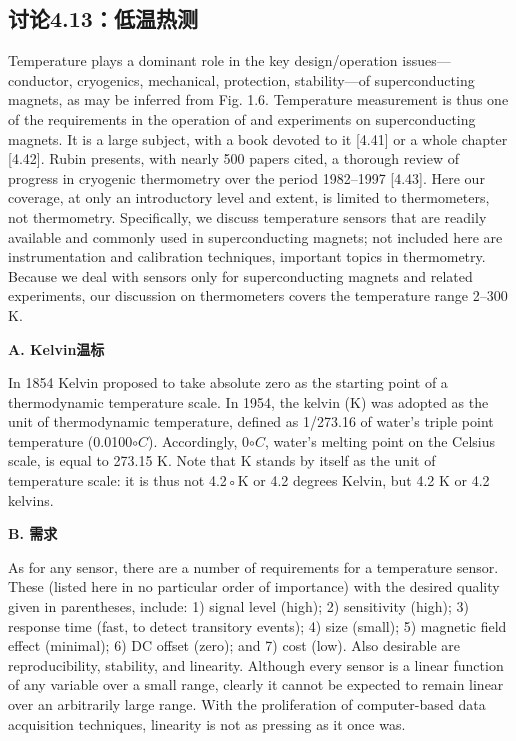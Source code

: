 \subsection{讨论4.13：低温热测}
Temperature plays a dominant role in the key design/operation issues—conductor,
cryogenics, mechanical, protection, stability—of superconducting magnets, as may
be inferred from Fig. 1.6. Temperature measurement is thus one of the requirements in the operation of and experiments on superconducting magnets. It is a
large subject, with a book devoted to it [4.41] or a whole chapter [4.42]. Rubin
presents, with nearly 500 papers cited, a thorough review of progress in cryogenic thermometry over the period 1982–1997 [4.43]. Here our coverage, at only
an introductory level and extent, is limited to thermometers, not thermometry.
Specifically, we discuss temperature sensors that are readily available and commonly used in superconducting magnets; not included here are instrumentation
and calibration techniques, important topics in thermometry. Because we deal
with sensors only for superconducting magnets and related experiments, our discussion on thermometers covers the temperature range 2–300 K.

\textbf{A. Kelvin温标}

In 1854 Kelvin proposed to take absolute zero as the starting point of a thermodynamic temperature scale. In 1954, the kelvin (K) was adopted as the unit of
thermodynamic temperature, defined as 1/273.16 of water’s triple point temperature (0.0100$\circ C$). Accordingly, 0$\circ C$, water’s melting point on the Celsius scale, is
equal to 273.15 K. Note that K stands by itself as the unit of temperature scale:
it is thus not 4.2◦K or 4.2 degrees Kelvin, but 4.2 K or 4.2 kelvins.

\textbf{B. 需求}

As for any sensor, there are a number of requirements for a temperature sensor.
These (listed here in no particular order of importance) with the desired quality
given in parentheses, include: 1) signal level (high); 2) sensitivity (high); 3) response time (fast, to detect transitory events); 4) size (small); 5) magnetic field
effect (minimal); 6) DC offset (zero); and 7) cost (low). Also desirable are reproducibility, stability, and linearity. Although every sensor is a linear function of any
variable over a small range, clearly it cannot be expected to remain linear over an
arbitrarily large range. With the proliferation of computer-based data acquisition
techniques, linearity is not as pressing as it once was.

